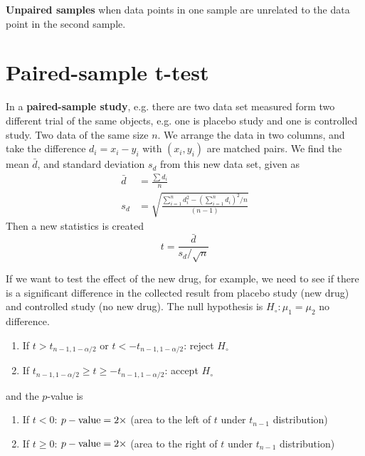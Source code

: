 {\bf Unpaired samples} when data points in one sample are unrelated to
the data point in the second sample.

\section{Paired-sample t-test}
\label{sec:paired-t-test}

In a {\bf paired-sample study}, e.g. there are two data set measured
form two different trial of the same objects, e.g. one is placebo
study and one is controlled study.  Two data of the same size $n$.  We
arrange the data in two columns, and take the difference $d_i=x_i-y_i$
with $(x_i,y_i)$ are matched pairs. We find the mean $\bar{d}$, and
standard deviation $s_d$ from this new data set, given as
\begin{equation}
  \label{eq:81}
  \begin{split}
    \bar{d} &= \frac{\sum d_i}{n} \\
    s_d &= \sqrt{\frac{\sum_{i=1}^nd_i^2 - \left( \sum_{i=1}^n d_i\right)^2/n}{(n-1)}}
  \end{split}
\end{equation}
Then a new statistics is created
\begin{equation}
  \label{eq:80}
  t = \frac{\bar{d}}{s_d/\sqrt{n}}
\end{equation}

If we want to test the effect of the new drug, for example, we need to
see if there is a significant difference in the collected result from
placebo study (new drug) and controlled study (no new drug). The null
hypothesis is $H_\circ: \mu_1 = \mu_2$  no difference.
\begin{enumerate}
\item If $t > t_{n-1, 1-\alpha/2}$ or $t < -t_{n-1, 1-\alpha/2}$:
  reject $H_\circ$

\item If $t_{n-1, 1-\alpha/2} \ge t \ge -t_{n-1, 1-\alpha/2}$: accept
  $H_\circ$

\end{enumerate}
and the $p$-value is
\begin{enumerate}
\item If $ t< 0$: $p-\text{value} =2\times $ (area to the left of $t$ under
  $t_{n-1}$ distribution)
\item If $ t \ge 0$: $p-\text{value} =2\times $ (area to the right of $t$ under
  $t_{n-1}$ distribution)
\end{enumerate}

